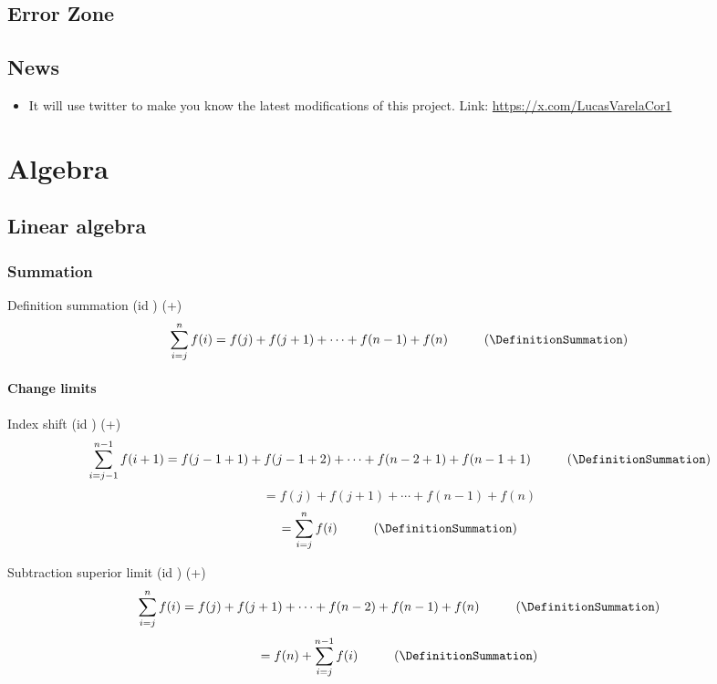 \documentclass{book}
\begin{document}
        \section{Error Zone}

        \section{News}
            \begin{itemize}
                \item It will use twitter to make you know the latest modifications of this project. Link: \url{https://x.com/LucasVarelaCor1}
            
            \end{itemize}      

    \chapter{Algebra}
        \section{Linear algebra}
            \subsection{Summation}
                Definition summation (id \DefinitionSummation) (+)
                \[\sum^n_{i=j} f(i) = f(j) + f(j + 1) + \cdots + f(n - 1) + f(n) \hspace{1cm} (\DefinitionSummation)\]
            
                \subsubsection{Change limits}
                    Index shift (id \IndexShift) (+)
                    \[\sum^{n - 1}_{i=j - 1} f(i + 1) = f(j - 1 + 1) + f(j - 1 + 2) + \cdots + f(n - 2 + 1) + f(n - 1 + 1) \hspace{1cm} (\DefinitionSummation)\]
                    \[= f(j) + f(j + 1) + \cdots + f(n - 1) + f(n)\]
                    \[= \sum^n_{i=j} f(i) \hspace{1cm} (\DefinitionSummation)\]
                                        
                    Subtraction superior limit (id \SubtractionSuperiorLimit) (+)
                    \[\sum^n_{i=j}f(i) = f(j) + f(j + 1) + \cdots + f(n - 2) + f(n - 1) + f(n) \hspace{1cm} (\DefinitionSummation)\]
                    \[= f(n) + \sum^{n - 1}_{i=j}f(i) \hspace{1cm} (\DefinitionSummation)\]
\end{document}
